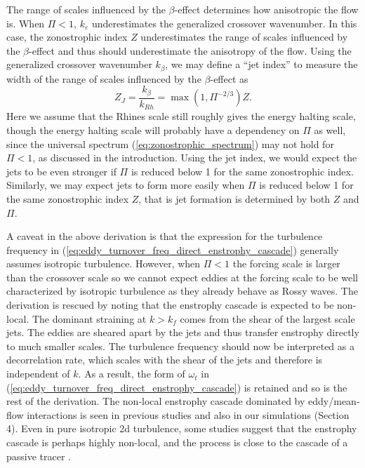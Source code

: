 \documentclass{jfm}
\begin{document}
The range of scales influenced by the $\beta$-effect determines
how anisotropic the flow is. When $\Pi<1$, 
$k_{\varepsilon}$ underestimates the generalized crossover wavenumber.
In this case, the zonostrophic index $Z$ underestimates the range
of scales influenced by the $\beta$-effect and thus should underestimate the anisotropy
of the flow. Using the generalized crossover wavenumber $k_{\beta}$,
we may define a ``jet index'' to measure the width of the
range of scales influenced by the $\beta$-effect as
\begin{equation}
Z_{J}=\frac{k_{\beta}}{k_{Rh}}=\max(1,\Pi^{-2/3})Z.\label{eq:jet index}
\end{equation}
Here we assume that the Rhines scale still roughly gives the energy
halting scale, though the energy halting scale will probably have a
dependency on $\Pi$ as well, since the universal spectrum (\ref{eq:zonostrophic_spectrum})
may not hold for $\Pi<1$, as discussed in the introduction. 
Using the jet index, we would
expect the jets to be even stronger if $\Pi$ is reduced below 1 for
the same zonostrophic index. Similarly, we may expect jets 
to form more easily when $\Pi$ is reduced
below 1 for the same zonostrophic index $Z$, that is jet
formation is determined by both $Z$ and $\Pi$. 

A caveat in the above derivation is that the expression for the turbulence frequency in
(\ref{eq:eddy_turnover_freq_direct_enstrophy_cascade}) generally 
assumes isotropic turbulence. However, when $\Pi<1$
the forcing scale is larger than the crossover scale
so we cannot expect eddies at the forcing scale to be well characterized by
isotropic turbulence as they already behave as Rossy waves.
The derivation is rescued by noting that the enstrophy cascade is expected
to be non-local. The dominant straining at $k>k_{f}$ comes from
the shear of the largest scale jets. The eddies are sheared apart
by the jets and thus transfer enstrophy directly to much smaller scales.
The turbulence frequency should now be interpreted as a
decorrelation rate, which scales with the shear of the jets and therefore
is independent of $k$. As a result, the form of $\omega_{t}$ in (\ref{eq:eddy_turnover_freq_direct_enstrophy_cascade})
is retained and so is the rest of the derivation. The non-local enstrophy
cascade dominated by eddy/mean-flow interactions is seen in previous
studies \citep{Manz2009} and also in our simulations (Section 4).
Even in pure isotropic 2d turbulence, some studies suggest that the enstrophy
cascade is perhaps highly non-local, and the process is close to the cascade
of a passive tracer \citep{Borue1993,Falkovich1994}.
\end{document}
